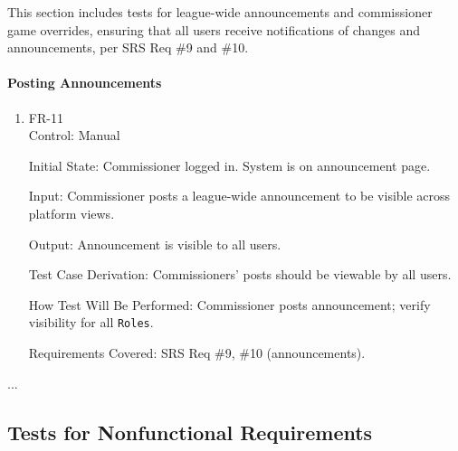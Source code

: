 \documentclass[12pt, titlepage]{article}
\begin{document}
This section includes tests for league-wide announcements and commissioner game overrides, ensuring that all users receive notifications of changes and announcements, per SRS Req \#9 and \#10.

\paragraph{Posting Announcements}

\begin{enumerate}

  \item{FR-11\\}
        Control: Manual

        Initial State: Commissioner logged in. System is on announcement page.

        Input: Commissioner posts a league-wide announcement to be visible across platform views.

        Output: Announcement is visible to all users.

        Test Case Derivation: Commissioners' posts should be viewable by all users.

        How Test Will Be Performed: Commissioner posts announcement; verify visibility for all \texttt{Roles}.

        Requirements Covered: SRS Req \#9, \#10 (announcements).
\end{enumerate}

...

\subsection{Tests for Nonfunctional Requirements}



\end{document}
